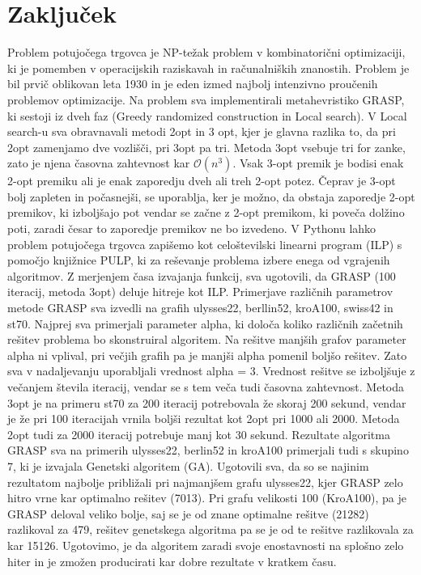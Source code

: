 \documentclass[12pt,a4paper]{amsart}
\theoremstyle{definition} %
\theoremstyle{plain} %
\begin{document}
\section{Zaključek}

Problem potujočega trgovca je NP-težak problem v kombinatorični optimizaciji, ki je pomemben v operacijskih raziskavah in računalniških znanostih.  Problem je bil prvič oblikovan leta 1930 in je eden izmed najbolj intenzivno proučenih problemov optimizacije. Na problem sva implementirali metahevristiko GRASP, ki sestoji iz dveh faz (Greedy randomized construction in Local search). V Local search-u sva obravnavali metodi 2opt in 3 opt, kjer je glavna razlika to, da pri 2opt zamenjamo dve vozlišči, pri 3opt pa tri. Metoda 3opt vsebuje tri for zanke, zato je njena časovna zahtevnost kar  $\mathcal{O}(n^3)$. Vsak 3-opt premik je bodisi enak 2-opt premiku ali je enak zaporedju dveh ali treh 2-opt potez. Čeprav je 3-opt bolj zapleten in počasnejši, se uporablja, ker je možno, da obstaja zaporedje 2-opt premikov, ki izboljšajo pot vendar se začne z 2-opt premikom, ki poveča dolžino poti, zaradi česar to zaporedje premikov ne bo izvedeno.  V Pythonu lahko problem potujočega trgovca zapišemo kot celoštevilski linearni program (ILP) s pomočjo knjižnice PULP, ki za reševanje problema izbere enega od vgrajenih algoritmov. Z merjenjem časa izvajanja funkcij, sva ugotovili, da GRASP (100 iteracij, metoda 3opt) deluje hitreje kot ILP.  Primerjave različnih parametrov metode GRASP sva izvedli na grafih ulysses22, berllin52, kroA100, swiss42 in st70.  Najprej sva primerjali parameter alpha, ki določa koliko različnih začetnih rešitev problema bo skonstruiral algoritem. Na rešitve manjših grafov parameter alpha ni vplival, pri večjih grafih pa je manjši alpha pomenil boljšo rešitev. Zato sva v nadaljevanju uporabljali vrednost alpha = 3. Vrednost rešitve se izboljšuje z večanjem števila iteracij, vendar se s tem veča tudi časovna zahtevnost. Metoda 3opt je na primeru st70 za 200 iteracij potrebovala že skoraj 200 sekund, vendar je že pri 100 iteracijah vrnila boljši rezultat kot 2opt pri 1000 ali 2000. Metoda 2opt tudi za 2000 iteracij potrebuje manj kot 30 sekund. Rezultate algoritma GRASP sva na primerih ulysses22, berlin52 in kroA100 primerjali tudi s skupino 7, ki je izvajala Genetski algoritem (GA). Ugotovili sva, da so se najinim rezultatom najbolje približali pri najmanjšem grafu ulysses22, kjer GRASP zelo hitro vrne kar optimalno rešitev (7013). Pri grafu velikosti 100 (KroA100), pa je GRASP deloval veliko bolje, saj se je od znane optimalne rešitve (21282) razlikoval za 479, rešitev genetskega algoritma pa se je od te rešitve razlikovala za kar 15126. Ugotovimo, je da algoritem zaradi svoje enostavnosti na splošno zelo hiter in je zmožen producirati kar dobre rezultate v kratkem času. 
\end{document}

